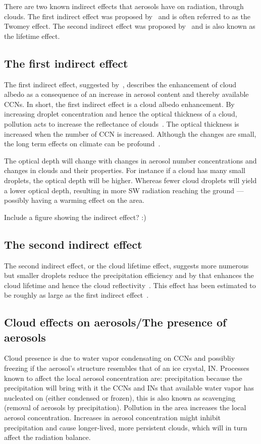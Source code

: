 There are two known indirect effects that aerosols have on radiation, through clouds. The first indirect effect was proposed by~\citet{Twomey1974} and is often referred to as the Twomey effect. The second indirect effect was proposed by~\citet{Albrecht1989} and is also known as the lifetime effect.

\subsection{The first indirect effect}%
The first indirect effect, suggested by~\citet{Twomey1974}, describes the enhancement of cloud albedo as a consequence of an increase in aerosol content and thereby available CCNs.
In short, the first indirect effect is a cloud albedo enhancement.
By increasing droplet concentration and hence the optical thickness of a cloud, pollution acts to increase the reflectance of clouds~\citep{Twomey1977}. 
The optical thickness is increased when the number of CCN is increased. Although the changes are small, the long term effects on climate can be profound~\citep{Twomey1974}.

The optical depth will change with changes in aerosol number concentrations and changes in clouds and their properties. For instance if a cloud has many small droplets, the optical depth will be higher. Whereas  fewer cloud droplets will yield a lower optical depth, resulting in more SW radiation reaching the ground — possibly having a warming effect on the area. 

Include a figure showing the indirect effect? :)

\subsection{The second indirect effect}
The second indirect effect, or the cloud lifetime effect, suggests more numerous but smaller droplets reduce the precipitation efficiency and by that enhances the cloud lifetime and hence the cloud reflectivity~\citep{Albrecht1989}. This effect has been estimated to be roughly as large as the first indirect effect~\citep{Lohmann2005}.

\subsection{Cloud effects on aerosols/The presence of aerosols}
Cloud presence is due to water vapor condensating on CCNs and possibliy freezing if the aerosol's structure resembles that of an ice crystal, IN. Processes known to affect the local aerosol concentration are: precipitation because the precipitation will bring with it the CCNs and INs that available water vapor has nucleated on (either condensed or frozen), this is also known as scavenging (removal of aerosols by precipitation). Pollution in the area increases the local aerosol concentration. Increases in aerosol concentration might inhibit precipitation and cause longer-lived, more persistent clouds, which will in turn affect the radiation balance.